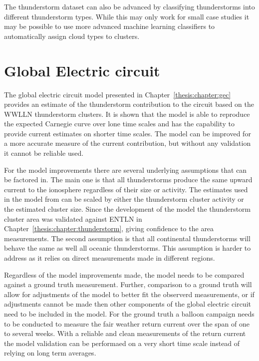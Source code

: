 The thunderstorm dataset can also be advanced by classifying thunderstorms into different thunderstorm types.
While this may only work for small case studies it may be possible to use more advanced machine learning classifiers to automatically assign cloud types to clusters.

\section{Global Electric circuit}

The global electric circuit model presented in Chapter~\ref{thesis:chapter:gec} provides an estimate of the thunderstorm contribution to the circuit based on the WWLLN thunderstorm clusters.
It is shown that the model is able to reproduce the expected Carnegie curve over lone time scales and has the capability to provide current estimates on shorter time scales.
The model can be improved for a more accurate measure of the current contribution, but without any validation it cannot be reliable used.

For the model improvements there are several underlying assumptions that can be factored in.
The main one is that all thunderstorms produce the same upward current to the ionosphere regardless of their size or activity.
The estimates used in the model from \citep{Mach2010} can be scaled by either the thunderstorm cluster activity or the estimated cluster size.
Since the development of the model the thunderstorm cluster area was validated against ENTLN in Chapter~\ref{thesis:chapter:thunderstorm}, giving confidence to the area measurements.
The second assumption is that all continental thunderstorms will behave the same as well all oceanic thunderstorms.
This assumption is harder to address as it relies on direct measurements made in different regions.

Regardless of the model improvements made, the model needs to be compared against a ground truth measurement.
Further, comparison to a ground truth will allow for adjustments of the model to better fit the observerd measurements, or if adjustments cannot be made then other components of the global electric circuit need to be included in the model.
For the ground truth a balloon campaign needs to be conducted to measure the fair weather return current over the span of one to several weeks.
With a reliable and clean measurements of the return current the model validation can be performaed on a very short time scale instead of relying on long term averages.


